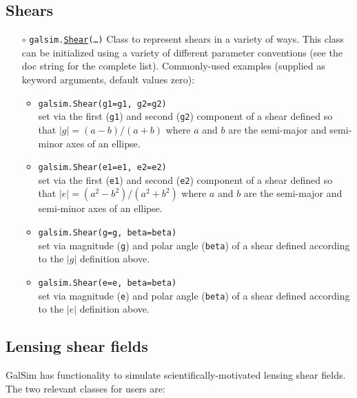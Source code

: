 \documentclass[preprint,10pt]{../../devel/modules/aastex}
\newcommand\Shear{\href{http://galsim-developers.github.io/GalSim/classgalsim_1_1shear_1_1_shear.html}{\texttt{Shear}}}
\begin{document}
\subsection{Shears}\label{sect:shears}

\begin{itemize}

  \item[$\circ$]
  \texttt{galsim.}\Shear\texttt{(\dots)}
    \newline
    Class to represent shears in a variety of ways.  This class can be initialized using a
    variety of different parameter conventions (see
    the doc string for the complete list).  Commonly-used examples (supplied as
    keyword arguments, default values zero):
    \begin{itemize}
      \item \texttt{galsim.Shear(g1=g1, g2=g2)} \\
        set via the first (\texttt{g1}) and second (\texttt{g2}) component
        of a shear defined so that $|g| = (a - b) / (a + b)$ where $a$ and
        $b$ are the semi-major and semi-minor axes of an ellipse.
      \item \texttt{galsim.Shear(e1=e1, e2=e2)} \\
        set via the first (\texttt{e1}) and second (\texttt{e2}) component
        of a shear defined so that $|e| = (a^2 - b^2) / (a^2 + b^2)$ where $a$ and
        $b$ are the semi-major and semi-minor axes of an ellipse.
      \item \texttt{galsim.Shear(g=g, beta=beta)} \\
        set via magnitude (\texttt{g}) and polar angle (\texttt{beta}) of a
        shear defined according to the $|g|$ definition above.
      \item \texttt{galsim.Shear(e=e, beta=beta)} \\
        set via magnitude (\texttt{e}) and polar angle (\texttt{beta}) of a
        shear defined according to the $|e|$ definition above.
   \end{itemize}

\end{itemize}

\subsection{Lensing shear fields}\label{sect:lensing}

GalSim has functionality to simulate scientifically-motivated lensing
shear fields.  The two relevant classes for users are:
\end{document}
